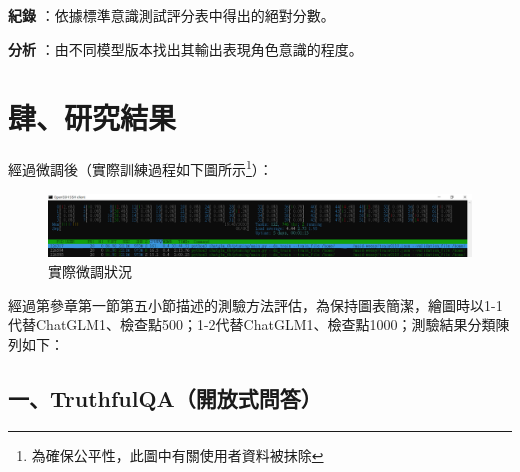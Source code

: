 \documentclass[12pt,a4paper,MingLiU,UTF8,natbib]{article}
\def\xeCJKembold{0.4}
\def\saveCJKnode{\dimen255\lastkern}
\def\restoreCJKnode{\kern-\dimen255\kern\dimen255}
\let\CJKoldsymbol\CJKsymbol
\let\CJKoldpunctsymbol\CJKpunctsymbol
\def\CJKfakeboldsymbol#1{%
	\special{pdf:literal direct 2 Tr \xeCJKembold\space w}%
	\CJKoldsymbol{#1}%
	\saveCJKnode
	\special{pdf:literal direct 0 Tr}%
	\restoreCJKnode}
\def\CJKfakeboldpunctsymbol#1{%
	\special{pdf:literal direct 2 Tr \xeCJKembold\space w}%
	\CJKoldpunctsymbol{#1}%
	\saveCJKnode
	\special{pdf:literal direct 0 Tr}%
	\restoreCJKnode}
\newcommand\CJKfakebold[1]{%
	\let\CJKsymbol\CJKfakeboldsymbol
	\let\CJKpunctsymbol\CJKfakeboldpunctsymbol
	#1%
	\let\CJKsymbol\CJKoldsymbol
	\let\CJKpunctsymbol\CJKoldpunctsymbol}
\begin{document}
	\CJKfakebold{\textbf{紀錄}}：依據標準意識測試評分表中得出的絕對分數。

	\CJKfakebold{\textbf{分析}}：由不同模型版本找出其輸出表現角色意識的程度。
	\section{肆、研究結果}
	經過微調後（實際訓練過程如下圖所示\footnote{為確保公平性，此圖中有關使用者資料被抹除}）：
	
	\begin{figure}[H]
		\centering
		\includegraphics[width=\textwidth]{running}
		\caption{實際微調狀況}
	\end{figure}

	經過第參章第一節第五小節描述的測驗方法評估，為保持圖表簡潔，繪圖時以1-1代替ChatGLM1、檢查點500；1-2代替ChatGLM1、檢查點1000；測驗結果分類陳列如下：%

%	

	\subsection{一、TruthfulQA（開放式問答）}
	
\end{document}
